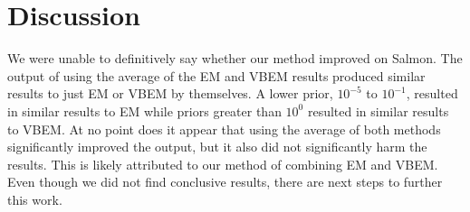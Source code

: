 \section{Discussion}

We were unable to definitively say whether our method improved on Salmon. The output of using the average of the EM and VBEM results produced similar results to just EM or VBEM by themselves. A lower prior, $10^{-5}$ to $10^{-1}$, resulted in similar results to EM while priors greater than $10^0$ resulted in similar results to VBEM. At no point does it appear that using the average of both methods significantly improved the output, but it also did not significantly harm the results. This is likely attributed to our method of combining EM and VBEM. Even though we did not find conclusive results, there are next steps to further this work. 
